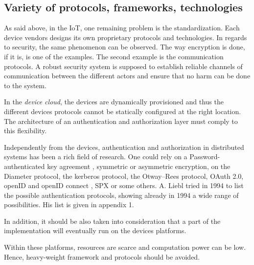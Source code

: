 \subsection{Variety of protocols, frameworks, technologies}
As said above, in the IoT, one remaining problem is the standardization. Each device vendors designs its own proprietary protocols and technologies. In regards to security, the same phenomenon can be observed. The way encryption is done, if it is, is one of the examples. The second example is the communication protocols. A robust security system is supposed to establish reliable channels of communication between the different actors and ensure that no harm can be done to the system. 

In the \emph{device cloud}, the devices are dynamically provisioned and thus the different devices protocols cannot be statically configured at the right location. The architecture of an authentication and authorization layer must comply to this flexibility.

Independently from the devices, authentication and authorization in distributed systems has been a rich field of research. One could rely on a Password-authenticated key agreement \cite{Hao2011}\cite{Pointcheval2012}\cite{Juang2008}, symmetric or asymmetric encryption\cite{Denning1982}, on the Diameter protocol, the kerberos protocol\cite{neuman2005kerberos}, the Otway–Rees protocol, OAuth 2.0\cite{hardt2012oauth}, openID\cite{Ghazizadeh} and openID connect \cite{sakimura2014openid}, SPX\cite{Tardo1991} or some others. A. Liebl tried in 1994 to list the possible authentication protocols, showing already in 1994 a wide range of possibilities. His list is given in appendix 1\cite{Liebl1993}.

In addition, it should be also taken into consideration that a part of the implementation will eventually run on the devices platforms. 

Within these platforms, resources are scarce and computation power can be low. Hence, heavy-weight framework and protocols should be avoided.






